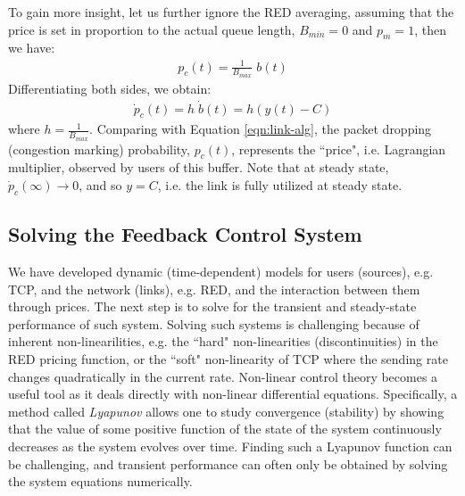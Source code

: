 \documentclass{article}
\begin{document}
To gain more insight, let us further ignore the RED averaging, 
assuming that the price is set in proportion to the actual queue length,
$B_{min}=0$ and $p_m = 1$, then we have:
\begin{eqnarray*}
p_c(t) = \frac{1}{B_{max}} \; b(t)
\end{eqnarray*}
Differentiating both sides, we obtain:
\begin{eqnarray*}
\dot{p}_c(t) = h \; \dot{b}(t) = h(y(t) - C)
\end{eqnarray*}
where $h = \frac{1}{B_{max}}$.
Comparing with Equation \ref{eqn:link-alg}, 
the packet dropping (congestion marking) probability, $p_c(t)$,
represents the ``price", i.e. Lagrangian multiplier, observed by users of this buffer.
Note that at steady state, $\dot{p}_c(\infty) \rightarrow 0$,
and so $y=C$, i.e. the link is fully utilized at steady state.

\subsection{Solving the Feedback Control System}

We have developed dynamic (time-dependent) models for users (sources), e.g. TCP, and the network (links), e.g. RED,
and the interaction between them through prices.
The next step is to solve for the transient and steady-state performance of such system.
Solving such systems is challenging because of inherent non-linearilities,
e.g. the ``hard" non-linearities (discontinuities) in the RED pricing function,
or the ``soft" non-linearity of TCP where the sending rate changes quadratically in the current rate.
Non-linear control theory becomes a useful tool as it deals directly with non-linear differential equations.
Specifically, a method called {\em Lyapunov} \cite{Ogata:2010} allows one to study convergence (stability) by showing that the value of some positive function of the state  of the system continuously decreases as the system evolves over time.
Finding such a Lyapunov function can be challenging, and 
transient performance can often only be obtained by solving the system equations numerically.
\end{document}
